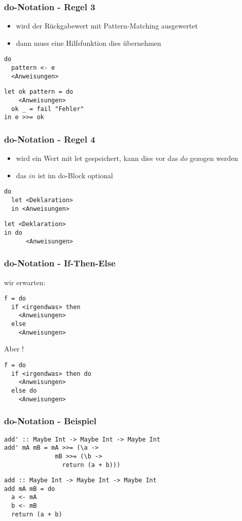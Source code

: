 \begin{frame}[fragile]
\frametitle{do-Notation - Regel 3}
\begin{itemize}
\item wird der Rückgabewert mit Pattern-Matching ausgewertet
\item dann muss eine Hilfsfunktion dies übernehmen
\end{itemize}
\begin{lstlisting}
do 
  pattern <- e
  <Anweisungen>
\end{lstlisting}	
\pause
\begin{lstlisting}
let ok pattern = do 
    <Anweisungen>
  ok _ = fail "Fehler" 
in e >>= ok
\end{lstlisting}	
\end{frame}

\begin{frame}[fragile]
\frametitle{do-Notation - Regel 4}
\begin{itemize}
\item wird ein Wert mit let gespeichert, kann dies vor das $do$ gezogen werden
\item das $in$ ist im do-Block optional
\end{itemize}
\begin{lstlisting}
do 
  let <Deklaration>
  in <Anweisungen>
\end{lstlisting}	
\pause
\begin{lstlisting}
let <Deklaration>
in do
      <Anweisungen>
\end{lstlisting}	
\end{frame}

\begin{frame}[fragile]
\frametitle{do-Notation - If-Then-Else}
wir erwarten:
\begin{lstlisting}
f = do 
  if <irgendwas> then
    <Anweisungen>
  else 
    <Anweisungen>
\end{lstlisting}	
Aber !
\begin{lstlisting}
f = do 
  if <irgendwas> then do
    <Anweisungen>
  else do 
    <Anweisungen>
\end{lstlisting}
\end{frame}

\begin{frame}[fragile]
\frametitle{do-Notation - Beispiel}
\begin{lstlisting}
add' :: Maybe Int -> Maybe Int -> Maybe Int
add' mA mB = mA >>= (\a ->
              mB >>= (\b ->
                return (a + b)))
\end{lstlisting}	
\pause
\begin{lstlisting}
add :: Maybe Int -> Maybe Int -> Maybe Int
add mA mB = do
  a <- mA
  b <- mB
  return (a + b)
\end{lstlisting}
\end{frame}


